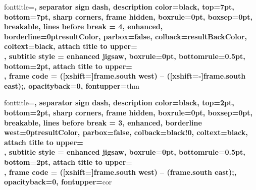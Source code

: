\usepackage[hidelinks]{hyperref}
\usepackage{cleveref}
\usepackage{bookmark}



\renewcommand{\qedsymbol}{$\square$}%
\usepackage[most]{tcolorbox}
%
{fonttitle=\sffamily\bfseries\color{resultColor},
      separator sign dash, description color=black,
      top=7pt, bottom=7pt,
      sharp corners, frame hidden, boxrule=0pt, boxsep=0pt, breakable,
      lines before break = 4,
      enhanced, borderline={\the\tcbBorderWidth}{0pt}{resultColor},
      parbox=false,
      colback=resultBackColor,
      coltext=black,
      attach title to upper={\\},
      subtitle style = {enhanced jigsaw, boxrule=0pt, bottomrule=0.5pt, bottom=2pt,
      attach title to upper={\\},
      frame code = { ([xshift=\the\tcbBorderWidth]frame.south west) -- ([xshift=-\the\tcbBorderWidth]frame.south east);}, 
      opacityback=0, fontupper=\color{black}}}{thm}
    {\begin{tcbtheo}{#1}{#2}}{\end{tcbtheo}}
%
{fonttitle=\sffamily\bfseries\color{resultColor},
      separator sign dash, description color=black,
      top=2pt, bottom=2pt,
      sharp corners,
      frame hidden, boxrule=0pt, boxsep=0pt, breakable,
      lines before break = 3,
      enhanced, borderline west={\the\tcbBorderWidth}{0pt}{resultColor},
      parbox=false,
      colback=black!0,
      coltext=black,
      attach title to upper={\\},
      subtitle style = {enhanced jigsaw, boxrule=0pt, bottomrule=0.5pt, bottom=2pt,
      attach title to upper={\\},
      frame code = { ([xshift=\the\tcbBorderWidth]frame.south west) -- (frame.south east);}, 
      opacityback=0, fontupper=\color{black}}}{cor}
